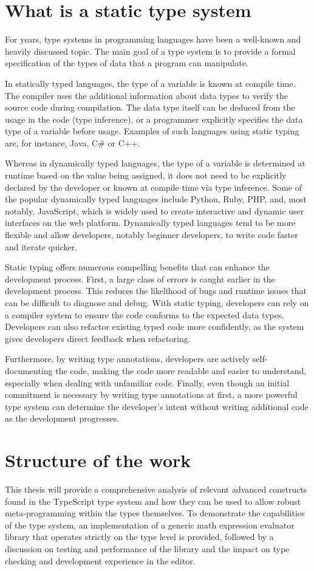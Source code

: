 \section{What is a static type system}

For years, type systems in programming languages have been a well-known and heavily discussed topic. The main goal of a type system is to provide a formal specification of the types of data that a program can manipulate.

In statically typed languages, the type of a variable is known at compile time. The compiler uses the additional information about data types to verify the source code during compilation. The data type itself can be deduced from the usage in the code (type inference), or a programmer explicitly specifies the data type of a variable before usage. Examples of such languages using static typing are, for instance, Java, C\# or C++.

Whereas in dynamically typed languages, the type of a variable is determined at runtime based on the value being assigned, it does not need to be explicitly declared by the developer or known at compile time via type inference. Some of the popular dynamically typed languages include Python, Ruby, PHP, and, most notably, JavaScript, which is widely used to create interactive and dynamic user interfaces on the web platform. Dynamically typed languages tend to be more flexible and allow developers, notably beginner developers, to write code faster and iterate quicker.

Static typing offers numerous compelling benefits that can enhance the development process. First, a large class of errors is caught earlier in the development process. This reduces the likelihood of bugs and runtime issues that can be difficult to diagnose and debug. With static typing, developers can rely on a compiler system to ensure the code conforms to the expected data types. Developers can also refactor existing typed code more confidently, as the system gives developers direct feedback when refactoring.

Furthermore, by writing type annotations, developers are actively self-documenting the code, making the code more readable and easier to understand, especially when dealing with unfamiliar code. Finally, even though an initial commitment is necessary by writing type annotations at first, a more powerful type system can determine the developer's intent without writing additional code as the development progresses. 

\section{Structure of the work}

This thesis will provide a comprehensive analysis of relevant advanced constructs found in the TypeScript type system and how they can be used to allow robust meta-programming within the types themselves. To demonstrate the capabilities of the type system, an implementation of a generic math expression evaluator library that operates strictly on the type level is provided, followed by a discussion on testing and performance of the library and the impact on type checking and development experience in the editor.
